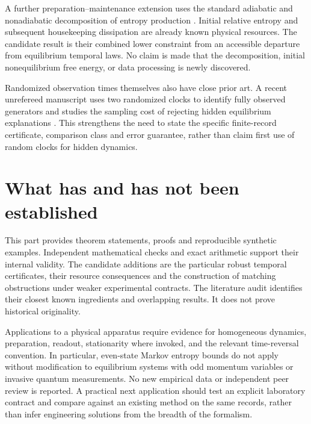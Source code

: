 A further preparation--maintenance extension uses the standard adiabatic and
nonadiabatic decomposition of entropy production \cite{rfEsposito2010}. Initial
relative entropy and subsequent housekeeping dissipation are already known
physical resources. The candidate result is their combined lower constraint
from an accessible departure from equilibrium temporal laws. No claim is made
that the decomposition, initial nonequilibrium free energy, or data processing
is newly discovered.

Randomized observation times themselves also have close prior art. A recent
unrefereed manuscript uses two randomized clocks to identify fully observed
generators and studies the sampling cost of rejecting hidden equilibrium
explanations \cite{rfAznagulov2026}. This strengthens the need to state the
specific finite-record certificate, comparison class and error guarantee,
rather than claim first use of random clocks for hidden dynamics.

\section{What has and has not been established}

This part provides theorem statements, proofs and reproducible synthetic
examples. Independent mathematical checks and exact arithmetic support their
internal validity. The candidate additions are the particular robust temporal
certificates, their resource consequences and the construction of matching
obstructions under weaker experimental contracts. The literature audit
identifies their closest known ingredients and overlapping results. It does
not prove historical originality.

Applications to a physical apparatus require evidence for homogeneous dynamics,
preparation, readout, stationarity where invoked, and the relevant time-reversal
convention. In particular, even-state Markov entropy bounds do not apply without
modification to equilibrium systems with odd momentum variables or invasive
quantum measurements. No new empirical data or independent peer review is
reported. A practical next application should test an explicit laboratory
contract and compare against an existing method on the same records, rather
than infer engineering solutions from the breadth of the formalism.

